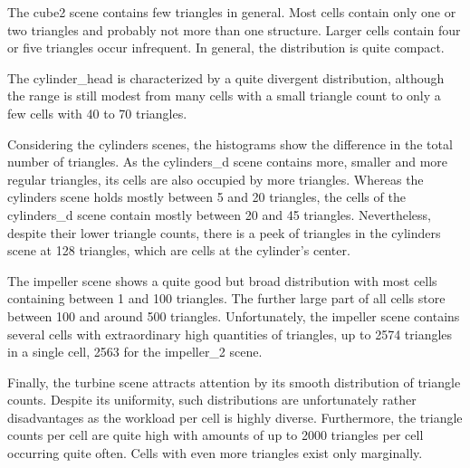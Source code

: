 The cube2 scene contains few triangles in general.
Most cells contain only one or two triangles and probably not more than one structure.
Larger cells contain four or five triangles occur infrequent.
In general, the distribution is quite compact.

The cylinder\_head is characterized by a quite divergent distribution, although the range is still modest from many cells with a small triangle count to only a few cells with 40 to 70 triangles.

Considering the cylinders scenes, the histograms show the difference in the total number of triangles.
As the cylinders\_d scene contains more, smaller and more regular triangles, its cells are also occupied by more triangles.
Whereas the cylinders scene holds mostly between 5 and 20 triangles, the cells of the cylinders\_d scene contain mostly between 20 and 45 triangles.
Nevertheless, despite their lower triangle counts, there is a peek of triangles in the cylinders scene at 128 triangles, which are cells at the cylinder's center.

The impeller scene shows a quite good but broad distribution with most cells containing between 1 and 100 triangles.
The further large part of all cells store between 100 and around 500 triangles.
Unfortunately, the impeller scene contains several cells with extraordinary high quantities of triangles, up to 2574 triangles in a single cell, 2563 for the impeller\_2 scene.

Finally, the turbine scene attracts attention by its smooth distribution of triangle counts.
Despite its uniformity, such distributions are unfortunately rather disadvantages as the workload per cell is highly diverse.
Furthermore, the triangle counts per cell are quite high with amounts of up to 2000 triangles per cell occurring quite often.
Cells with even more triangles exist only marginally.

